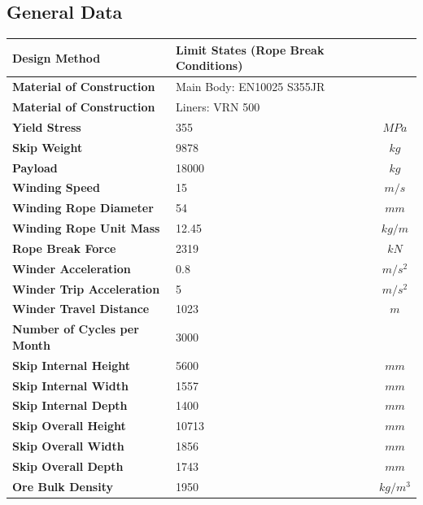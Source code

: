 \documentclass{article}%
\begin{document}
%
\subsection{General Data}%
\label{subsec:GeneralData}%
\begin{flushleft}%
\begin{minipage}{\textwidth}%
\flushleft%
\begin{tabular}{|l |l |c|}%
\hline%
\textbf{Design Method}&Limit States (Rope Break Conditions)&\\%
\hline%
\textbf{Material of Construction}&Main Body: EN10025 S355JR&\\%
\hline%
\textbf{Material of Construction}&Liners: VRN 500&\\%
\hline%
\textbf{Yield Stress}&355&$MPa$\\%
\hline%
\textbf{Skip Weight}&9878&$kg$\\%
\hline%
\textbf{Payload}&18000&$kg$\\%
\hline%
\textbf{Winding Speed}&15&$m/s$\\%
\hline%
\textbf{Winding Rope Diameter}&54&$mm$\\%
\hline%
\textbf{Winding Rope Unit Mass}&12.45&$kg/m$\\%
\hline%
\textbf{Rope Break Force}&2319&$kN$\\%
\hline%
\textbf{Winder Acceleration}&0.8&$m/s^2$\\%
\hline%
\textbf{Winder Trip Acceleration}&5&$m/s^2$\\%
\hline%
\textbf{Winder Travel Distance}&1023&$m$\\%
\hline%
\textbf{Number of Cycles per Month}&3000&\\%
\hline%
\textbf{Skip Internal Height}&5600&$mm$\\%
\hline%
\textbf{Skip Internal Width}&1557&$mm$\\%
\hline%
\textbf{Skip Internal Depth}&1400&$mm$\\%
\hline%
\textbf{Skip Overall Height}&10713&$mm$\\%
\hline%
\textbf{Skip Overall Width}&1856&$mm$\\%
\hline%
\textbf{Skip Overall Depth}&1743&$mm$\\%
\hline%
\textbf{Ore Bulk Density}&1950&$kg/m^3$\\%
\hline%
\end{tabular}%
\end{minipage}%
\end{flushleft}

%
\newpage%
\end{document}
